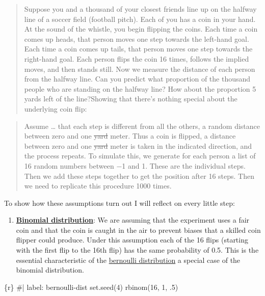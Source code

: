 \documentclass[
  letterpaper,
  DIV=11,
  numbers=noendperiod]{scrreprt}
\newenvironment{Shaded}{\begin{snugshade}}{\end{snugshade}}
\newcommand{\CommentTok}[1]{\textcolor[rgb]{0.37,0.37,0.37}{#1}}
\newcommand{\DecValTok}[1]{\textcolor[rgb]{0.68,0.00,0.00}{#1}}
\newcommand{\FunctionTok}[1]{\textcolor[rgb]{0.28,0.35,0.67}{#1}}
\newcommand{\InformationTok}[1]{\textcolor[rgb]{0.37,0.37,0.37}{#1}}
\newcommand{\NormalTok}[1]{\textcolor[rgb]{0.00,0.23,0.31}{#1}}
\providecommand{\tightlist}{%
  \setlength{\itemsep}{0pt}\setlength{\parskip}{0pt}}\usepackage{longtable,booktabs,array}
\begin{document}
\begin{quote}
Suppose you and a thousand of your closest friends line up on the
halfway line of a soccer field (football pitch). Each of you has a coin
in your hand. At the sound of the whistle, you begin flipping the coins.
Each time a coin comes up heads, that person moves one step towards the
left-hand goal. Each time a coin comes up tails, that person moves one
step towards the right-hand goal. Each person flips the coin 16 times,
follows the implied moves, and then stands still. Now we measure the
distance of each person from the halfway line. Can you predict what
proportion of the thousand people who are standing on the halfway line?
How about the proportion 5 yards left of the line?Showing that there's
nothing special about the underlying coin flip:
\end{quote}

\begin{quote}
Assume \ldots{} that each step is different from all the others, a
random distance between zero and one \st{yard} meter. Thus a coin is
flipped, a distance between zero and one \st{yard} meter is taken in the
indicated direction, and the process repeats. To simulate this, we
generate for each person a list of 16 random numbers between −1 and 1.
These are the individual steps. Then we add these steps together to get
the position after 16 steps. Then we need to replicate this procedure
1000 times.
\end{quote}

To show how these assumptions turn out I will reflect on every little
step:

\begin{enumerate}
\def\labelenumi{\arabic{enumi}.}
\tightlist
\item
  \href{https://en.wikipedia.org/wiki/Binomial_distribution}{\textbf{Binomial
  distribution}}: We are assuming that the experiment uses a fair coin
  and that the coin is caught in the air to prevent biases that a
  skilled coin flipper could produce. Under this assumption each of the
  16 flips (starting with the first flip to the 16th flip) has the same
  probability of 0.5. This is the essential characteristic of the
  \href{https://en.wikipedia.org/wiki/Bernoulli_distribution}{bernoulli
  distribution} a special case of the binomial distribution.
\end{enumerate}

\begin{Shaded}
\begin{Highlighting}[]
\InformationTok{\textasciigrave{}\textasciigrave{}\textasciigrave{}\{r\}}
\CommentTok{\#| label: bernoulli{-}dist}
\FunctionTok{set.seed}\NormalTok{(}\DecValTok{4}\NormalTok{)}
\FunctionTok{rbinom}\NormalTok{(}\DecValTok{16}\NormalTok{, }\DecValTok{1}\NormalTok{, .}\DecValTok{5}\NormalTok{)}
\InformationTok{\textasciigrave{}\textasciigrave{}\textasciigrave{}}
\end{Highlighting}
\end{Shaded}
\end{document}
